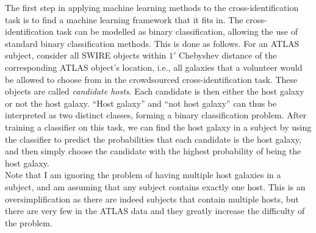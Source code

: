 \documentclass[a4paper]{article}
\begin{document}
      The first step in applying machine learning methods to the cross-identification task is to find a machine learning framework that it fits in. The cross-identification task can be modelled as binary classification, allowing the use of standard binary classification methods. This is done as follows. For an ATLAS subject, consider all SWIRE objects within $1'$ Chebyshev distance of the corresponding ATLAS object's location, i.e., all galaxies that a volunteer would be allowed to choose from in the crowdsourced cross-identification task. These objects are called \emph{candidate hosts}. Each candidate is then either the host galaxy or not the host galaxy. ``Host galaxy'' and ``not host galaxy'' can thus be interpreted as two distinct classes, forming a binary classification problem. After training a classifier on this task, we can find the host galaxy in a subject by using the classifier to predict the probabilities that each candidate is the host galaxy, and then simply choose the candidate with the highest probability of being the host galaxy.\\



      Note that I am ignoring the problem of having multiple host galaxies in a subject, and am assuming that any subject contains exactly one host. This is an oversimplification as there are indeed subjects that contain multiple hosts, but there are very few in the ATLAS data and they greatly increase the difficulty of the problem.

\end{document}

